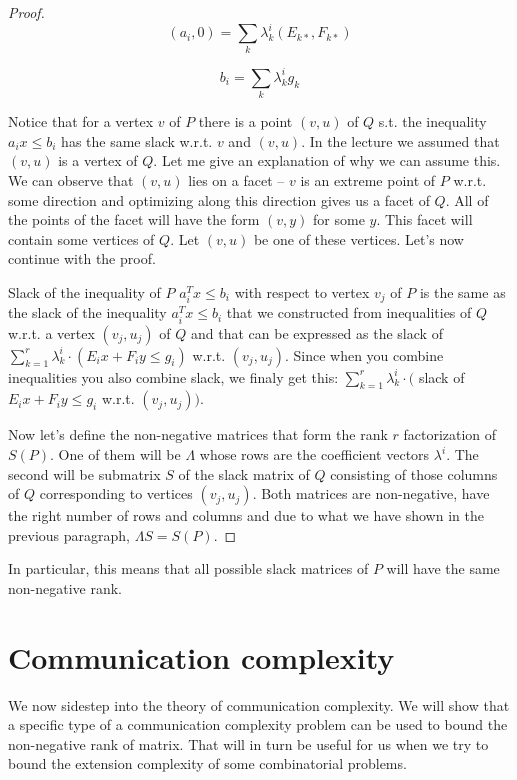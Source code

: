 \documentclass{article}
\begin{document}
\begin{proof}
	$$
	(a_i, 0) = \sum_{k} \lambda_k^i (E_{k*}, F_{k*})
	$$

	$$
	b_i = \sum_k \lambda_k^i g_k
	$$

	Notice that for a vertex $v$ of $P$ there is a point $(v, u)$ of $Q$
	s.t. the inequality $a_ix \le b_i$ has the same slack w.r.t. $v$ and
	$(v, u)$. In the lecture we assumed that $(v, u)$ is a vertex of $Q$.
	Let me give an explanation of why we can assume this. We can observe
	that $(v, u)$ lies on a facet -- $v$ is an extreme point of $P$ w.r.t.
	some direction and optimizing along this direction gives us a facet of
	$Q$. All of the points of the facet will have the form $(v, y)$ for
	some $y$. This facet will contain some vertices of $Q$. Let $(v, u)$ be
	one of these vertices. Let's now continue with the proof.

	Slack of the inequality of $P$ $a_i^Tx \le b_i$ with respect to vertex
	$v_j$ of $P$ is the same as the slack of the inequality $a_i^Tx \le
	b_i$ that we constructed from inequalities of $Q$ w.r.t. a vertex
	$(v_j, u_j)$ of $Q$ and that can be expressed as the slack of $\sum_{k
	= 1}^r \lambda_k^i \cdot (E_ix + F_iy \le g_i)$ w.r.t. $(v_j, u_j)$.
	Since when you combine inequalities you also combine slack, we finaly
	get this: $\sum_{k = 1}^r \lambda_k^i \cdot ($ slack of $E_ix + F_iy
	\le g_i$ w.r.t. $(v_j, u_j))$.

	Now let's define the non-negative matrices that form the rank $r$
	factorization of $S(P)$. One of them will be $\Lambda$ whose rows are
	the coefficient vectors $\lambda^i$. The second will be submatrix $S$
	of the slack matrix of $Q$ consisting of those columns of $Q$
	corresponding to vertices $(v_j, u_j)$. Both matrices are non-negative,
	have the right number of rows and columns and due to what we have shown
	in the previous paragraph, $\Lambda S = S(P)$.
\end{proof}

In particular, this means that all possible slack matrices of $P$ will have the
same non-negative rank.


\section{Communication complexity}

We now sidestep into the theory of communication complexity. We will show that
a specific type of a communication complexity problem can be used to bound the
non-negative rank of matrix. That will in turn be useful for us when we try to
bound the extension complexity of some combinatorial problems.
\end{document}
